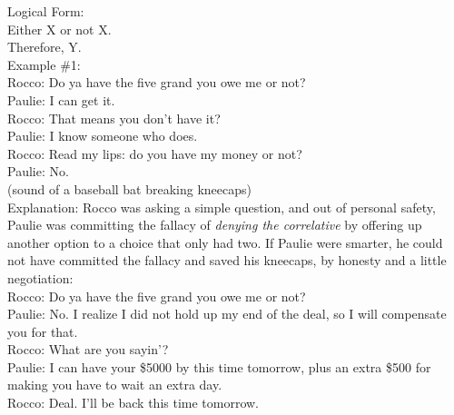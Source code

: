 \documentclass[a4paper,12pt,single,pdftex]{scrbook}
\begin{document}
    
      Logical Form:
    \\

    
      Either X or not X.
    \\

    
      Therefore, Y.
    \\

    
      Example \#1:
    \\

    
      Rocco:  Do ya have the five grand you owe me or not?
    \\

    
      Paulie: I can get it.
    \\

    
      Rocco: That means you don’t have it?
    \\

    
      Paulie: I know someone who does.
    \\

    
      Rocco: Read my lips: do you have my money or not?
    \\

    
      Paulie: No.
    \\

    
      (sound of a baseball bat breaking kneecaps)
    \\

    
      Explanation: Rocco was asking a simple question, and out of personal safety, Paulie was committing the fallacy of {\it denying the correlative} by offering up another option to a choice that only had two.  If Paulie were smarter, he could not have committed the fallacy and saved his kneecaps, by honesty and a little negotiation:
    \\

    
      Rocco:  Do ya have the five grand you owe me or not?
    \\

    
      Paulie: No. I realize I did not hold up my end of the deal, so I will compensate you for that.
    \\

    
      Rocco: What are you sayin’?
    \\

    
      Paulie: I can have your \$5000 by this time tomorrow, plus an extra \$500 for making you have to wait an extra day.
    \\

    
      Rocco: Deal.  I’ll be back this time tomorrow.
    \\
\end{document}
